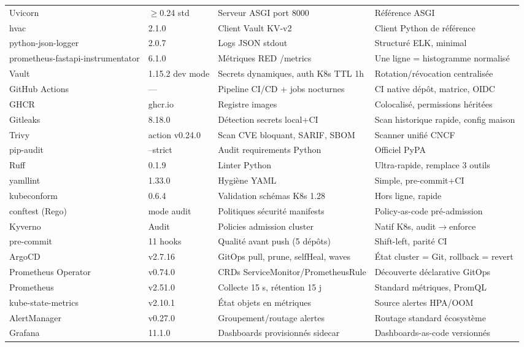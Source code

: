 \documentclass[12pt,a4paper]{article}
\begin{document}
{\begin{longtable}{@{}p{3.0cm}p{1.9cm}p{4.7cm}p{4.7cm}@{}}
Uvicorn & $\geq$0.24 std & Serveur ASGI port 8000 & Référence ASGI \\
hvac & 2.1.0 & Client Vault KV-v2 & Client Python de référence \\
python-json-logger & 2.0.7 & Logs JSON stdout & Structuré ELK, minimal \\
prometheus-fastapi-instrumentator & 6.1.0 & Métriques RED /metrics & Une ligne = histogramme normalisé \\
Vault & 1.15.2 dev mode & Secrets dynamiques, auth K8s TTL 1h & Rotation/révocation centralisée \\
GitHub Actions & --- & Pipeline CI/CD + jobs nocturnes & CI native dépôt, matrice, OIDC \\
GHCR & ghcr.io & Registre images & Colocalisé, permissions héritées \\
Gitleaks & 8.18.0 & Détection secrets local+CI & Scan historique rapide, config maison \\
Trivy & action v0.24.0 & Scan CVE bloquant, SARIF, SBOM & Scanner unifié CNCF \\
pip-audit & --strict & Audit requirements Python & Officiel PyPA \\
Ruff & 0.1.9 & Linter Python & Ultra-rapide, remplace 3 outils \\
yamllint & 1.33.0 & Hygiène YAML & Simple, pre-commit+CI \\
kubeconform & 0.6.4 & Validation schémas K8s 1.28 & Hors ligne, rapide \\
conftest (Rego) & mode audit & Politiques sécurité manifests & Policy-as-code pré-admission \\
Kyverno & Audit & Policies admission cluster & Natif K8s, audit$\rightarrow$enforce \\
pre-commit & 11 hooks & Qualité avant push (5 dépôts) & Shift-left, parité CI \\
ArgoCD & v2.7.16 & GitOps pull, prune, selfHeal, waves & État cluster = Git, rollback = revert \\
Prometheus Operator & v0.74.0 & CRDs ServiceMonitor/PrometheusRule & Découverte déclarative GitOps \\
Prometheus & v2.51.0 & Collecte 15 s, rétention 15 j & Standard métriques, PromQL \\
kube-state-metrics & v2.10.1 & État objets en métriques & Source alertes HPA/OOM \\
AlertManager & v0.27.0 & Groupement/routage alertes & Routage standard écosystème \\
Grafana & 11.1.0 & Dashboards provisionnés sidecar & Dashboards-as-code versionnés \\

\end{longtable}}
\end{document}
